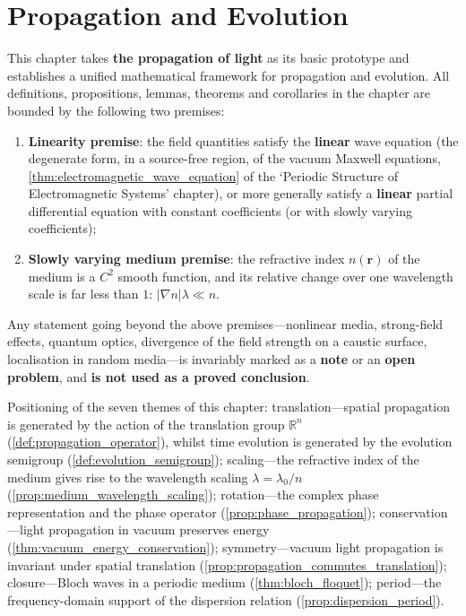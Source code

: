 \chapter{Propagation and Evolution}
\label{chap:propagation}

\begin{remark}\label{rem:propagation_chapter_positioning}
This chapter takes \textbf{the propagation of light} as its basic prototype and establishes a unified mathematical framework for propagation and evolution. All definitions, propositions, lemmas, theorems and corollaries in the chapter are bounded by the following two premises:

\begin{enumerate}[label=(\alph*)]
    \item \textbf{Linearity premise}: the field quantities satisfy the \textbf{linear} wave equation (the degenerate form, in a source-free region, of the vacuum Maxwell equations, \cref{thm:electromagnetic_wave_equation} of the `Periodic Structure of Electromagnetic Systems' chapter), or more generally satisfy a \textbf{linear} partial differential equation with constant coefficients (or with slowly varying coefficients);
    \item \textbf{Slowly varying medium premise}: the refractive index $n(\mathbf{r})$ of the medium is a $C^2$ smooth function, and its relative change over one wavelength scale is far less than $1$: $|\nabla n|\lambda \ll n$.
\end{enumerate}

Any statement going beyond the above premises---nonlinear media, strong-field effects, quantum optics, divergence of the field strength on a caustic surface, localisation in random media---is invariably marked as a \textbf{note} or an \textbf{open problem}, and \textbf{is not used as a proved conclusion}.

Positioning of the seven themes of this chapter: translation---spatial propagation is generated by the action of the translation group $\mathbb{R}^n$ (\cref{def:propagation_operator}), whilst time evolution is generated by the evolution semigroup (\cref{def:evolution_semigroup}); scaling---the refractive index of the medium gives rise to the wavelength scaling $\lambda = \lambda_0/n$ (\cref{prop:medium_wavelength_scaling}); rotation---the complex phase representation and the phase operator (\cref{prop:phase_propagation}); conservation---light propagation in vacuum preserves energy (\cref{thm:vacuum_energy_conservation}); symmetry---vacuum light propagation is invariant under spatial translation (\cref{prop:propagation_commutes_translation}); closure---Bloch waves in a periodic medium (\cref{thm:bloch_floquet}); period---the frequency-domain support of the dispersion relation (\cref{prop:dispersion_period}).
\end{remark}

